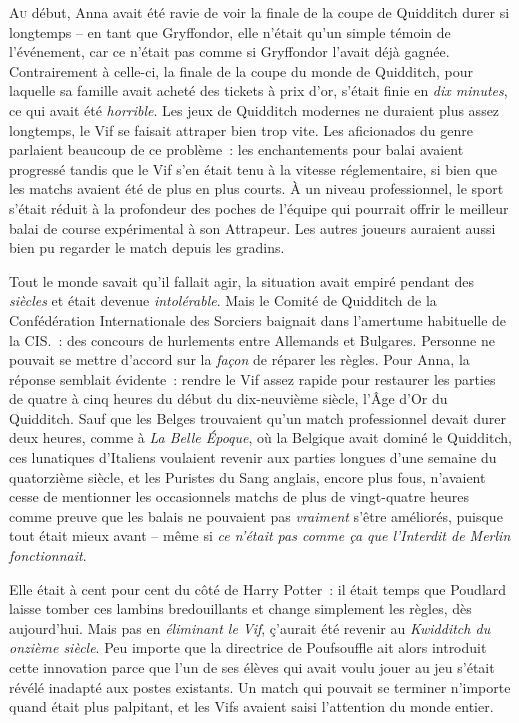 
\lettrine{A}{u} début, Anna avait été ravie de voir la finale de la coupe de Quidditch durer si longtemps -- en tant que Gryffondor, elle n'était qu'un simple témoin de l'événement, car ce n'était pas comme si Gryffondor l'avait déjà gagnée. Contrairement à celle-ci, la finale de la coupe du monde de Quidditch, pour laquelle sa famille avait acheté des tickets à prix d'or, s'était finie en \emph{dix minutes}, ce qui avait été \emph{horrible}. Les jeux de Quidditch modernes ne duraient plus assez longtemps, le Vif se faisait attraper bien trop vite. Les aficionados du genre parlaient beaucoup de ce problème~: les enchantements pour balai avaient progressé tandis que le Vif s'en était tenu à la vitesse réglementaire, si bien que les matchs avaient été de plus en plus courts. À un niveau professionnel, le sport s'était réduit à la profondeur des poches de l'équipe qui pourrait offrir le meilleur balai de course expérimental à son Attrapeur. Les autres joueurs auraient aussi bien pu regarder le match depuis les gradins.

Tout le monde savait qu'il fallait agir, la situation avait empiré pendant des \emph{siècles} et était devenue \emph{intolérable}. Mais le Comité de Quidditch de la Confédération Internationale des Sorciers baignait dans l'amertume habituelle de la CIS.~: des concours de hurlements entre Allemands et Bulgares. Personne ne pouvait se mettre d'accord sur la \emph{façon} de réparer les règles. Pour Anna, la réponse semblait évidente~: rendre le Vif assez rapide pour restaurer les parties de quatre à cinq heures du début du dix-neuvième siècle, l'Âge d'Or du Quidditch. Sauf que les Belges trouvaient qu'un match professionnel devait durer deux heures, comme à \emph{La Belle Époque}, où la Belgique avait dominé le Quidditch, ces lunatiques d'Italiens voulaient revenir aux parties longues d'une semaine du quatorzième siècle, et les Puristes du Sang anglais, encore plus fous, n'avaient cesse de mentionner les occasionnels matchs de plus de vingt-quatre heures comme preuve que les balais ne pouvaient pas \emph{vraiment} s'être améliorés, puisque tout était mieux avant -- même si \emph{ce n'était pas comme ça que l'Interdit de Merlin fonctionnait}.

Elle était à cent pour cent du côté de Harry Potter~: il était temps que Poudlard laisse tomber ces lambins bredouillants et change simplement les règles, dès aujourd'hui. Mais pas en \emph{éliminant le Vif}, ç'aurait été revenir au \emph{Kwidditch du onzième siècle}. Peu importe que la directrice de Poufsouffle ait alors introduit cette innovation parce que l'un de ses élèves qui avait voulu jouer au jeu s'était révélé inadapté aux postes existants. Un match qui pouvait se terminer n'importe quand était plus palpitant, et les Vifs avaient saisi l'attention du monde entier.

